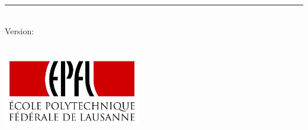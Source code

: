 %
\begin{titlepage}
	\flushright
	\hfill
	\vfill
	{\LARGE\thesisTitle \par}
	\rule[5pt]{\textwidth}{.4pt} \par
	{\Large\thesisName}
	\vfill
	\textit{\large\thesisDate} \\
	Version: \thesisVersion
\end{titlepage}


\begin{titlepage}
	\tgherosfont
	\centering

	{\Large \thesisUniversity} \\[4mm]
	\includegraphics[width=6cm]{gfx/EPFL} \\[2mm]
	\textsf{\thesisUniversityDepartment} \\
	\textsf{\thesisUniversityInstitute} \\

	\vfill
	{\large \thesisSubject} \\[5mm]
	{\LARGE \color{ctcolortitle}\textbf{\thesisTitle} \\[10mm]}
	{\Large \thesisName} \\


\end{titlepage}
